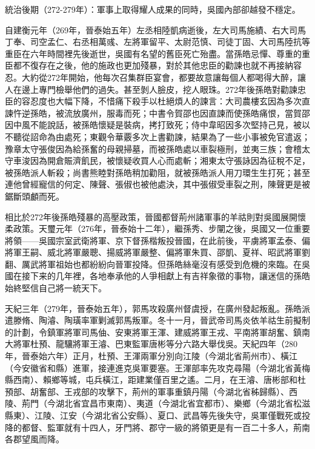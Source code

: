統治後期（272-279年）：軍事上取得耀人成果的同時，吳國內部卻越發不穩定。

自建衡元年（269年，晉泰始五年）左丞相陸凱病逝後，左大司馬施績、右大司馬丁奉、司空孟仁、右丞相萬彧、左將軍留平、太尉范慎、司徒丁固、大司馬陸抗等重臣在六年時間裡先後逝世，吳國有名望的舊臣死亡殆盡。當孫皓忌憚、尊重的重臣都不復存在之後，他的施政也更加殘暴，對於其他忠臣的勸諫也就不再接納容忍。大約從272年開始，他每次召集群臣宴會，都要故意讓每個人都喝得大醉，讓人在邊上專門檢舉他們的過失。甚至剝人臉皮，挖人眼珠。272年後孫皓對勸諫忠臣的容忍度也大幅下降，不惜痛下殺手以杜絕煩人的諫言：大司農樓玄因為多次直諫忤逆孫皓，被流放廣州，服毒而死；中書令賀邵也因直諫而使孫皓痛恨，當賀邵因中風不能說話，被孫皓懷疑是裝病，拷打致死；侍中韋昭因多次堅持己見，被以不聽從詔命為由處死；東觀令華覈多次上書勸諫，結果為了一些小事被免官遣返；豫章太守張俊因為給孫奮的母親掃墓，而被孫皓處以車裂極刑，並夷三族；會稽太守車浚因為開倉賑濟飢民，被懷疑收買人心而處斬；湘東太守張詠因為征稅不足，被孫皓派人斬殺；尚書熊睦對孫皓稍加勸阻，就被孫皓派人用刀環生生打死；甚至連他曾經寵信的何定、陳聲、張俶也被他處決，其中張俶受車裂之刑，陳聲更是被鋸斷頭顱而死。

相比於272年後孫皓殘暴的高壓政策，晉國都督荊州諸軍事的羊祜則對吳國展開懷柔政策。天璽元年（276年，晉泰始十二年），繼孫秀、步闡之後，吳國又一位重要將領——吳國宗室武衛將軍、京下督孫楷叛投晉國，在此前後，平虜將軍孟泰、偏將軍王嗣、威北將軍嚴聰、揚威將軍嚴整、偏將軍朱買、邵凱、夏祥、昭武將軍劉翻、厲武將軍祖始也都紛紛向晉軍投降。但孫皓絲毫沒有感受到危機的來臨。在吳國在接下来的几年裡，各地奉承他的人爭相獻上有吉祥象徵的事物，讓迷信的孫皓始終堅信自己將一統天下。

天紀三年（279年，晉泰始五年），郭馬攻殺廣州督虞授，在廣州發起叛亂。孫皓派遣滕脩、陶濬、陶璜率軍剿滅郭馬叛軍。冬十一月，晉武帝司馬炎依羊祜生前擬制的計劃，令鎮軍將軍司馬伷、安東將軍王渾、建威將軍王戎、平南將軍胡奮、鎮南大將軍杜預、龍驤將軍王濬、巴東監軍唐彬等分六路大舉伐吳。天紀四年（280年，晉泰始六年）正月，杜預、王渾兩軍分別向江陵（今湖北省荊州市）、橫江（今安徽省和縣）進軍，接連進克吳軍要塞。王渾部率先攻克尋陽（今湖北省黃梅縣西南）、賴鄉等城，屯兵橫江，距建業僅百里之遙。二月，在王濬、唐彬部和杜預部、胡奮部、王戎部的攻擊下，荊州的軍事重鎮丹陽（今湖北省秭歸縣）、西陵、荊門（今湖北省宜昌市東南）、夷道（今湖北省宜都市）、樂鄉（今湖北省松滋縣東）、江陵、江安（今湖北省公安縣）、夏口、武昌等先後失守，吳軍僅戰死或投降的都督、監軍就有十四人，牙門將、郡守一級的將領更是有一百二十多人，荊南各郡望風而降。

